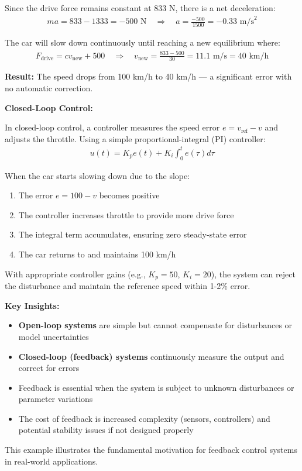 \documentclass[11pt,a4paper]{article}
\begin{document}
Since the drive force remains constant at 833 N, there is a net deceleration:
\begin{align}
  ma = 833 - 1333 = -500 \text{ N} \quad \Rightarrow \quad a = \frac{-500}{1500} = -0.33 \text{ m/s}^2
\end{align}

The car will slow down continuously until reaching a new equilibrium where:
\begin{align}
  F_{\text{drive}} = cv_{\text{new}} + 500 \quad \Rightarrow \quad v_{\text{new}} = \frac{833 - 500}{30} = 11.1 \text{ m/s} = 40 \text{ km/h}
\end{align}

\textbf{Result:} The speed drops from 100 km/h to 40 km/h — a significant error with no automatic correction.

\textbf{Closed-Loop Control:}

In closed-loop control, a controller measures the speed error $e = v_{\text{ref}} - v$ and adjusts the throttle. Using a simple proportional-integral (PI) controller:
\begin{align}
  u(t) = K_p e(t) + K_i \int_0^t e(\tau) d\tau
\end{align}

When the car starts slowing down due to the slope:
\begin{enumerate}
  \item The error $e = 100 - v$ becomes positive
  \item The controller increases throttle to provide more drive force
  \item The integral term accumulates, ensuring zero steady-state error
  \item The car returns to and maintains 100 km/h
\end{enumerate}

With appropriate controller gains (e.g., $K_p = 50$, $K_i = 20$), the system can reject the disturbance and maintain the reference speed within 1-2\% error.

\textbf{Key Insights:}
\begin{itemize}
  \item \textbf{Open-loop systems} are simple but cannot compensate for disturbances or model uncertainties
  \item \textbf{Closed-loop (feedback) systems} continuously measure the output and correct for errors
  \item Feedback is essential when the system is subject to unknown disturbances or parameter variations
  \item The cost of feedback is increased complexity (sensors, controllers) and potential stability issues if not designed properly
\end{itemize}

This example illustrates the fundamental motivation for feedback control systems in real-world applications.
\end{document}
